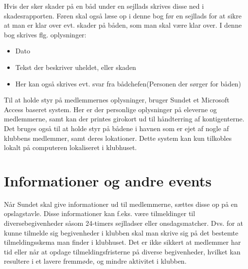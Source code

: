 Hvis der sker skader på en båd under en sejllads skrives disse ned i skadesrapporten. Føren skal også læse op i denne bog før en sejllads for at sikre at man er klar over evt. skader på båden, som man skal være klar over. I denne bog skrives flg. oplysninger:

\begin{itemize}
	\item Dato
	\item Tekst der beskriver uheldet, eller skaden
	\item Her kan også skrives evt. svar fra bådchefen(Personen der sørger for båden)
\end{itemize}

Til at holde styr på medlemmernes oplysninger, bruger Sundet et Microsoft Access baseret system. Her er der personlige oplysninger på eleverne og medlemmerne, samt kan der printes girokort ud til håndterring af kontigenterne. Det bruges også til at holde styr på bådene i havnen som er ejet af nogle af klubbens medlemmer, samt deres lokationer. Dette system kan kun tilkobles lokalt på computeren lokaliseret i klubhuset.

\section{Informationer og andre events}

Når Sundet skal give informationer ud til medlemmerne, sættes disse op på en opslagstavle. Disse informationer kan f.eks. være tilmeldinger til diversebegivenheder såsom 24-timers sejlladser eller onsdagsmatcher. Dvs. for at kunne tilmelde sig begivenheder i klubben skal man skrive sig på det bestemte tilmeldingsskema man finder i klubhuset. Det er ikke sikkert at medlemmer har tid eller når at opdage tilmeldingsfristerne på diverse begivenheder, hvilket kan resultere i et lavere fremmøde, og mindre aktivitet i klubben.
